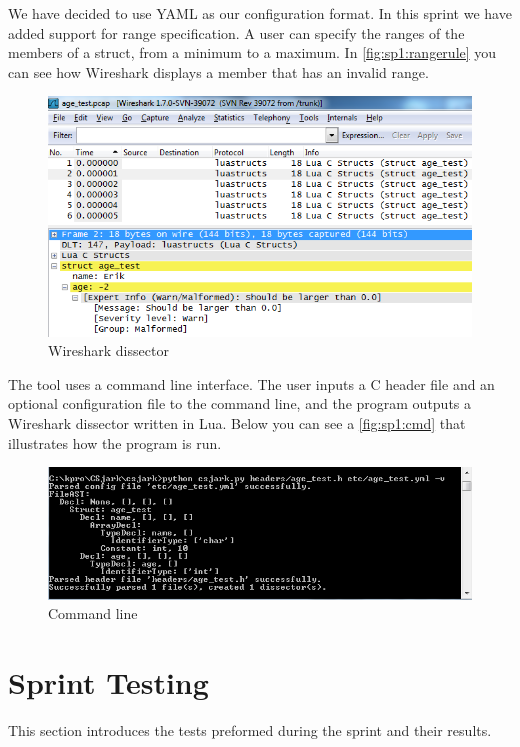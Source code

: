 We have decided to use YAML as our configuration format. In this sprint we have
added support for range specification. A user can specify the ranges of the
members of a struct, from a minimum to a maximum. In
\autoref{fig:sp1:rangerule} you can see how Wireshark displays a member that
has an invalid range. 

\begin{figure}[htb]
	\center
	\includegraphics[width=\textwidth]{./sprints/img/wireshark_outofrange}
	\caption{Wireshark dissector\label{fig:sp1:rangerule}}
\end{figure}

The tool uses a command line interface. The user inputs a C header file and
an optional configuration file to the command line, and the program outputs a
Wireshark dissector written in Lua. Below you can see a \autoref{fig:sp1:cmd}
that illustrates how the program is run.

\begin{figure}[ht]
	\includegraphics[width=\textwidth]{./sprints/img/cmd_agetest_run}
	\caption{Command line\label{fig:sp1:cmd}}
\end{figure}


\section{Sprint Testing}
This section introduces the tests preformed during the sprint and their
results.

